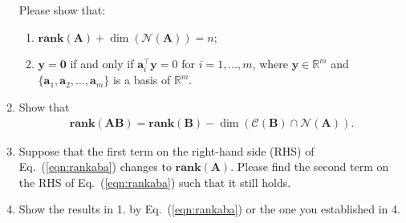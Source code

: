 \documentclass[11pt,letter,notitlepage]{article}
\renewcommand{\eqref}[1]{Eq.~(\ref{#1})}
\newcommand{\rank}[1]{ \textbf{rank}  (#1)  }
\begin{document}
\begin{exercise}
\begin{enumerate}
                Please show that:
	               \begin{enumerate}
                	    \item $\rank{\mathbf{A}} + \dim ( \mathcal{N}( \mathbf{A} ) ) = n$;
                	    \item $\mathbf{y}=\mathbf{0}$ if and only if $\mathbf{a}_i^{\top}\mathbf{y}=0$ for $i=1,\ldots,m$, where $\mathbf{y}\in \mathbb{R}^m$ and  $\{\mathbf{a}_1,\mathbf{a}_2,\ldots,\mathbf{a}_m\}$ is a basis of $\mathbb{R}^m$.
                	\end{enumerate}    
        \item Show that
        \begin{align}\label{eqn:rankaba}
            \rank{\mathbf{AB}}=\rank{\mathbf{B}}-\dim(\mathcal{C}(\mathbf{B})\cap \mathcal{N}(\mathbf{A})).
        \end{align}
        \item Suppose that the first term on the right-hand side (RHS) of \eqref{eqn:rankaba} changes to $\rank{\mathbf{A}}$. Please find the second term on the RHS of \eqref{eqn:rankaba} such that it still holds.
        \item Show the results in 1. by \eqref{eqn:rankaba} or the one you established in 4.
	\end{enumerate}
\end{exercise}
\end{document}
